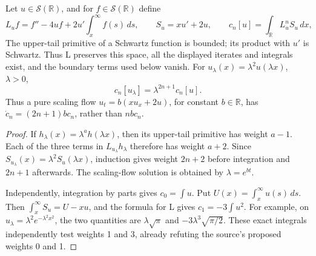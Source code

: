 \begin{proposition}\oursComputed{}
Let \(u\in\mathcal S(\mathbb R)\), and for
\(f\in\mathcal S(\mathbb R)\) define
\[
 L_u f=f''-4uf+2u'\int_x^\infty f(s)\,ds,\qquad
 S_u=xu'+2u,\qquad c_n[u]=\int_{\mathbb R}L_u^n S_u\,dx,
\]
The upper-tail primitive of a Schwartz function is bounded; its
product with \(u'\) is Schwartz. Thus L preserves this space,
all the displayed iterates and integrals exist, and the boundary
terms used below vanish.
For \(u_\lambda(x)=\lambda^2u(\lambda x)\), \(\lambda>0\),
\[
 c_n[u_\lambda]=\lambda^{2n+1}c_n[u].
\]
Thus a pure scaling flow \(u_t=b(xu_x+2u)\), for constant \(b\in\mathbb R\),
has \(\dot c_n=(2n+1)bc_n\), rather than \(nbc_n\).
\end{proposition}
\begin{proof}
If \(h_\lambda(x)=\lambda^a h(\lambda x)\), then its upper-tail
primitive has weight \(a-1\). Each of the three terms in
\(L_{u_\lambda}h_\lambda\) therefore has weight \(a+2\). Since
\(S_{u_\lambda}(x)=\lambda^2S_u(\lambda x)\), induction gives
weight \(2n+2\) before integration and \(2n+1\) afterwards.
The scaling-flow solution is obtained by \(\lambda=e^{bt}\).

Independently, integration by parts gives \(c_0=\int u\).
Put \(U(x)=\int_x^\infty u(s)\,ds\). Then
\(\int_x^\infty S_u=U-xu\), and the formula for L gives
\(c_1=-3\int u^2\). For example, on
\(u_\lambda=\lambda^2e^{-\lambda^2x^2}\), the two quantities are
\(\lambda\sqrt\pi\) and \(-3\lambda^3\sqrt{\pi/2}\).
These exact integrals independently test weights 1 and 3, already
refuting the source's proposed weights 0 and 1.
\end{proof}

